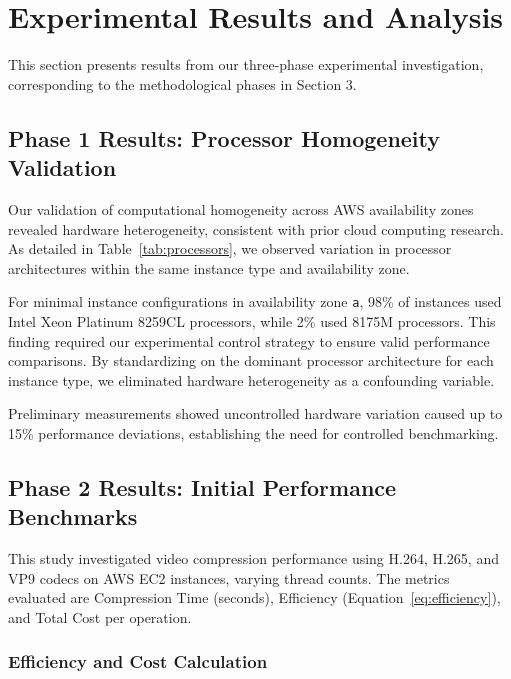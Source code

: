 \documentclass[conference]{IEEEtran}
\begin{document}
	\section{Experimental Results and Analysis}
	\label{experiments}
	
	This section presents results from our three-phase experimental investigation, corresponding to the methodological phases in Section 3.
	
	\subsection{Phase 1 Results: Processor Homogeneity Validation}
	\label{results-phase1}
	
	Our validation of computational homogeneity across AWS availability zones revealed hardware heterogeneity, consistent with prior cloud computing research. As detailed in Table~\ref{tab:processors}, we observed variation in processor architectures within the same instance type and availability zone.
	
	For minimal instance configurations in availability zone \texttt{a}, 98\% of instances used Intel Xeon Platinum 8259CL processors, while 2\% used 8175M processors. This finding required our experimental control strategy to ensure valid performance comparisons. By standardizing on the dominant processor architecture for each instance type, we eliminated hardware heterogeneity as a confounding variable.
	
	Preliminary measurements showed uncontrolled hardware variation caused up to 15\% performance deviations, establishing the need for controlled benchmarking.
	
	\subsection{Phase 2 Results: Initial Performance Benchmarks}
	\label{results-phase2}
	
	This study investigated video compression performance using H.264, H.265, and VP9 codecs on AWS EC2 instances, varying thread counts. The metrics evaluated are Compression Time (seconds), Efficiency (Equation~\ref{eq:efficiency}), and Total Cost per operation.
	
	\subsubsection{Efficiency and Cost Calculation}
	\label{efficiency-calculation}
	
\end{document}
